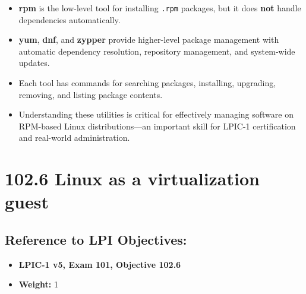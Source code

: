 \documentclass[12pt,a4paper]{report}
\begin{document}
\begin{itemize}
    \item \textbf{rpm} is the low-level tool for installing \texttt{.rpm} packages, but it does \textbf{not} handle dependencies automatically.
    \item \textbf{yum}, \textbf{dnf}, and \textbf{zypper} provide higher-level package management with automatic dependency resolution, repository management, and system-wide updates.
    \item Each tool has commands for searching packages, installing, upgrading, removing, and listing package contents.
    \item Understanding these utilities is critical for effectively managing software on RPM-based Linux distributions—an important skill for LPIC-1 certification and real-world administration.
\end{itemize}







\newpage

\section*{102.6 Linux as a virtualization guest}



\subsection*{Reference to LPI Objectives:}
\begin{itemize}
    \item \textbf{LPIC-1 v5, Exam 101, Objective 102.6}
    \item \textbf{Weight:} 1
\end{itemize}
\end{document}
